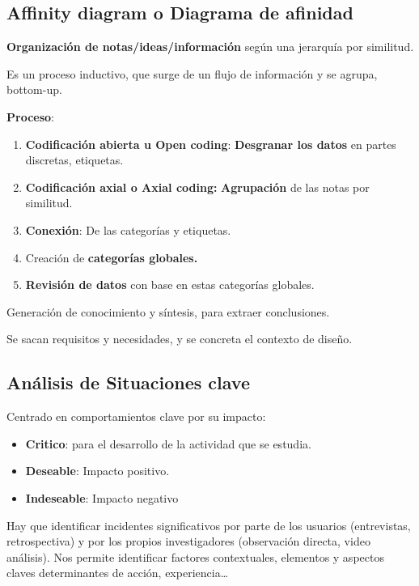 \documentclass[12pt]{report} %
\begin{document}
\subsection{Affinity diagram o Diagrama de
afinidad}

\textbf{Organización de notas/ideas/información} según una jerarquía por
similitud.

Es un proceso inductivo, que surge de un flujo de información y se
agrupa, bottom-up.

\textbf{Proceso}:

\begin{enumerate}
\item
  \textbf{Codificación abierta u Open coding}: \textbf{Desgranar los
  datos} en partes discretas, etiquetas.
\item
  \textbf{Codificación axial o Axial coding:} \textbf{Agrupación} de las
  notas por similitud.
\item
  \textbf{Conexión}: De las categorías y etiquetas.
\item
  Creación de \textbf{categorías globales.}
\item
  \textbf{Revisión de datos} con base en estas categorías globales.
\end{enumerate}

Generación de conocimiento y síntesis, para extraer conclusiones.

Se sacan requisitos y necesidades, y se concreta el contexto de diseño.

\subsection{Análisis de Situaciones
clave}

Centrado en comportamientos clave por su impacto:

\begin{itemize}

\item
  \textbf{Critico}: para el desarrollo de la actividad que se estudia.
\item
  \textbf{Deseable}: Impacto positivo.
\item
  \textbf{Indeseable}: Impacto negativo
\end{itemize}

Hay que identificar incidentes significativos por parte de los usuarios
(entrevistas, retrospectiva) y por los propios investigadores
(observación directa, video análisis). Nos permite identificar factores
contextuales, elementos y aspectos claves determinantes de acción,
experiencia\ldots{}
\end{document}
